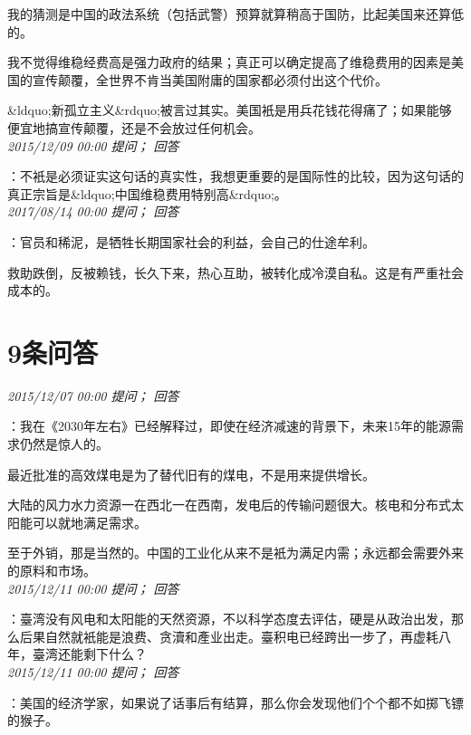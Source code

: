 \documentclass[twocolumn]{ctexart}
\begin{document}
我的猜测是中国的政法系统（包括武警）预算就算稍高于国防，比起美国来还算低的。

我不觉得维稳经费高是强力政府的结果；真正可以确定提高了维稳费用的因素是美国的宣传颠覆，全世界不肯当美国附庸的国家都必须付出这个代价。

\&ldquo;新孤立主义\&rdquo;被言过其实。美国衹是用兵花钱花得痛了；如果能够便宜地搞宣传颠覆，还是不会放过任何机会。\\

\textit{\hfill\noindent\small 2015/12/09 00:00 提问； 回答}

：不衹是必须证实这句话的真实性，我想更重要的是国际性的比较，因为这句话的真正宗旨是\&ldquo;中国维稳费用特别高\&rdquo;。\\

\textit{\hfill\noindent\small 2017/08/14 00:00 提问； 回答}

：官员和稀泥，是牺牲长期国家社会的利益，会自己的仕途牟利。

救助跌倒，反被赖钱，长久下来，热心互助，被转化成冷漠自私。这是有严重社会成本的。\\

\section{9条问答}

\textit{\hfill\noindent\small 2015/12/07 00:00 提问； 回答}

：我在《2030年左右》已经解释过，即使在经济减速的背景下，未来15年的能源需求仍然是惊人的。

最近批准的高效煤电是为了替代旧有的煤电，不是用来提供增长。

大陆的风力水力资源一在西北一在西南，发电后的传输问题很大。核电和分布式太阳能可以就地满足需求。

至于外销，那是当然的。中国的工业化从来不是衹为满足内需；永远都会需要外来的原料和市场。\\

\textit{\hfill\noindent\small 2015/12/11 00:00 提问； 回答}

：臺湾没有风电和太阳能的天然资源，不以科学态度去评估，硬是从政治出发，那么后果自然就衹能是浪费、贪瀆和產业出走。臺积电已经跨出一步了，再虚耗八年，臺湾还能剩下什么？\\

\textit{\hfill\noindent\small 2015/12/11 00:00 提问； 回答}

：美国的经济学家，如果说了话事后有结算，那么你会发现他们个个都不如掷飞镖的猴子。
\end{document}
